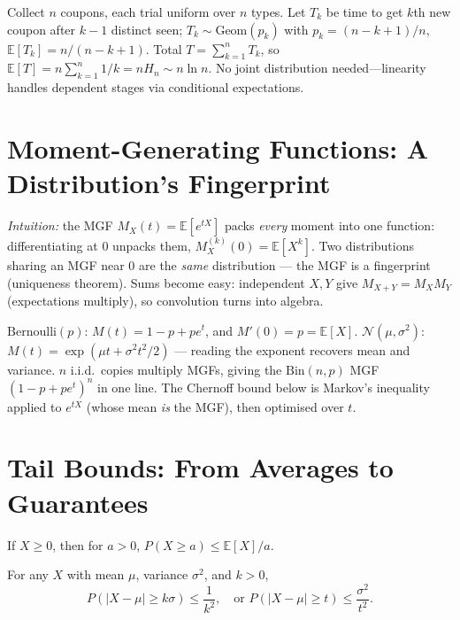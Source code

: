 \begin{example} Collect $n$ coupons, each trial uniform over $n$ types. Let $T_k$ be time to get $k$th new coupon after $k-1$ distinct seen; $T_k\sim\mathrm{Geom}(p_k)$ with $p_k=(n-k+1)/n$, $\mathbb{E}[T_k]=n/(n-k+1)$. Total $T=\sum_{k=1}^nT_k$, so $\mathbb{E}[T]=n\sum_{k=1}^n1/k=nH_n\sim n\ln n$. No joint distribution needed---linearity handles dependent stages via conditional expectations.
\end{example}

\section{Moment-Generating Functions: A Distribution's Fingerprint}
\label{sec:mgf}
\emph{Intuition:} the MGF $M_X(t)=\mathbb{E}[e^{tX}]$ packs \emph{every} moment into one function: differentiating at $0$ unpacks them, $M_X^{(k)}(0)=\mathbb{E}[X^k]$. Two distributions sharing an MGF near $0$ are the \emph{same} distribution --- the MGF is a fingerprint (uniqueness theorem). Sums become easy: independent $X,Y$ give $M_{X+Y}=M_XM_Y$ (expectations multiply), so convolution turns into algebra.
\begin{example}[MGFs] $\mathrm{Bernoulli}(p)$: $M(t)=1-p+pe^t$, and $M'(0)=p=\mathbb{E}[X]$. $\mathcal{N}(\mu,\sigma^2)$: $M(t)=\exp(\mu t+\sigma^2t^2/2)$ --- reading the exponent recovers mean and variance. $n$ i.i.d.\ copies multiply MGFs, giving the $\mathrm{Bin}(n,p)$ MGF $(1-p+pe^t)^n$ in one line. The Chernoff bound below is Markov's inequality applied to $e^{tX}$ (whose mean \emph{is} the MGF), then optimised over $t$.
\end{example}

\section{Tail Bounds: From Averages to Guarantees}
\label{sec:tail-bounds}

\begin{theorem}[Markov] If $X\ge0$, then for $a>0$, $P(X\ge a)\le\mathbb{E}[X]/a$.
\end{theorem}

\begin{theorem}[Chebyshev] For any $X$ with mean $\mu$, variance $\sigma^2$, and $k>0$,
\[
P(|X-\mu|\ge k\sigma)\le\frac1{k^2},\quad\text{or }P(|X-\mu|\ge t)\le\frac{\sigma^2}{t^2}.
\]
\end{theorem}

